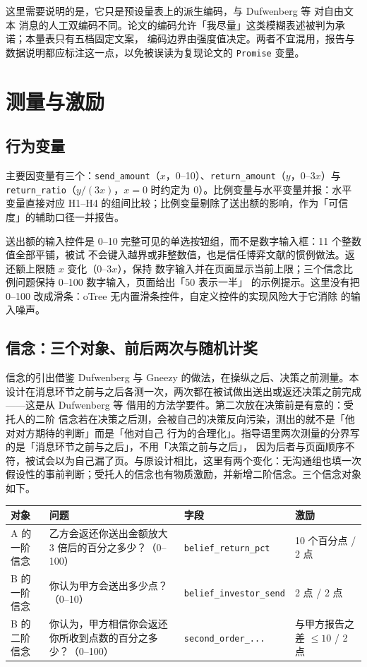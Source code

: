 \documentclass[10pt,a4paper]{ctexart}
\newcommand{\code}[1]{\texttt{#1}}
\begin{document}
这里需要说明的是，它只是预设量表上的派生编码，与 Dufwenberg 等\cite{dufwenberg2026} 对自由文本
消息的人工双编码不同。论文的编码允许「我尽量」这类模糊表述被判为承诺；本量表只有五档固定文案，
编码边界由强度值决定。两者不宜混用，报告与数据说明都应标注这一点，以免被误读为复现论文的
\texttt{Promise} 变量。

\section{测量与激励}\label{sec:measures}

\subsection{行为变量}

主要因变量有三个：\code{send\_amount}（$x$，0--10）、\code{return\_amount}（$y$，0--$3x$）与
\code{return\_ratio}（$y/(3x)$，$x=0$ 时约定为 0）。比例变量与水平变量并报：水平变量直接对应
H1--H4 的组间比较；比例变量剔除了送出额的影响，作为「可信度」的辅助口径一并报告。

送出额的输入控件是 0--10 完整可见的单选按钮组，而不是数字输入框：11 个整数值全部平铺，被试
不会键入越界或非整数值，也是信任博弈文献的惯例做法。返还额上限随 $x$ 变化（0--$3x$），保持
数字输入并在页面显示当前上限；三个信念比例问题保持 0--100 数字输入，页面给出「50 表示一半」
的示例提示。这里没有把 0--100 改成滑条：oTree 无内置滑条控件，自定义控件的实现风险大于它消除
的输入噪声。

\subsection{信念：三个对象、前后两次与随机计奖}

信念的引出借鉴 Dufwenberg 与 Gneezy\cite{dufwenberg2000} 的做法，在操纵之后、决策之前测量。本
设计在消息环节之前与之后各测一次，两次都在被试做出送出或返还决策之前完成——这是从
Dufwenberg 等\cite{dufwenberg2026} 借用的方法学要件。第二次放在决策前是有意的：受托人的二阶
信念若在决策之后测，会被自己的决策反向污染，测出的就不是「他对对方期待的判断」而是「他对自己
行为的合理化」。指导语里两次测量的分界写的是「消息环节之前与之后」，不用「决策之前与之后」，
因为后者与页面顺序不符，被试会以为自己漏了页。与原设计相比，这里有两个变化：无沟通组也填一次
假设性的事前判断；受托人的信念也有物质激励，并新增二阶信念。三个信念对象如下。

\begin{table}[h]
\centering\small
\begin{tabular}{p{3.3cm}p{4.7cm}p{3.3cm}p{2.4cm}}
\toprule
对象 & 问题 & 字段 & 激励 \\
\midrule
A 的一阶信念 & 乙方会返还你送出金额放大 3 倍后的百分之多少？（0--100） &
\code{belief\_return\_pct} & 10 个百分点 / 2 点 \\
B 的一阶信念 & 你认为甲方会送出多少点？（0--10） &
\code{belief\_\allowbreak investor\_\allowbreak send} & 2 点 / 2 点 \\
B 的二阶信念 & 你认为，甲方相信你会返还你所收到点数的百分之多少？（0--100） &
\code{second\_order\_...} & 与甲方报告之差 $\leq 10$ / 2 点 \\
\bottomrule
\end{tabular}
\end{table}
\end{document}
